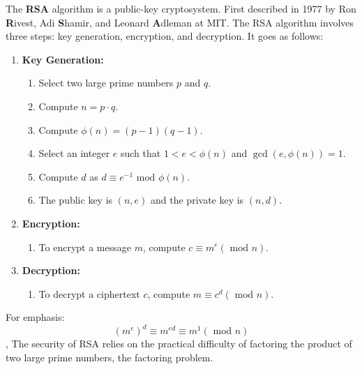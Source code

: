 \begin{Def}

    \label{def:rsa}
    The \textbf{RSA} algorithm is a public-key cryptosystem. First described in 1977 by Ron \textbf{R}ivest, Adi \textbf{S}hamir, and Leonard \textbf{A}dleman at MIT.
    The RSA algorithm involves three steps: key generation, encryption, and decryption. It goes as follows:
    \begin{enumerate}
        \item \textbf{Key Generation:} 
        \begin{enumerate}
            \item Select two large prime numbers $p$ and $q$.
            \item Compute $n=p \cdot q$.
            \item Compute $\phi(n)=(p-1)(q-1)$.
            \item Select an integer $e$ such that $1<e<\phi(n)$ and $\gcd(e,\phi(n))=1$.
            \item Compute $d$ as $d \equiv e^{-1} \text{ mod } \phi(n)$.
            \item The public key is $(n,e)$ and the private key is $(n,d)$.
        \end{enumerate}
        \item \textbf{Encryption:} 
        \begin{enumerate}
            \item To encrypt a message $m$, compute $c \equiv m^e (\text{ mod } n)$.
        \end{enumerate}
        \item \textbf{Decryption:} 
        \begin{enumerate}
            \item To decrypt a ciphertext $c$, compute $m \equiv c^d (\text{ mod } n)$.
        \end{enumerate}
    \end{enumerate}
    \noindent
    For emphasis:
    $$(m^e)^d \equiv m^{ed} \equiv m^1 (\text{ mod } n)$$,
    \noindent
    The security of RSA relies on the practical difficulty of factoring the product of two large prime numbers, the factoring problem. \hfill \cite{RSA}
\end{Def}

\newpage 

